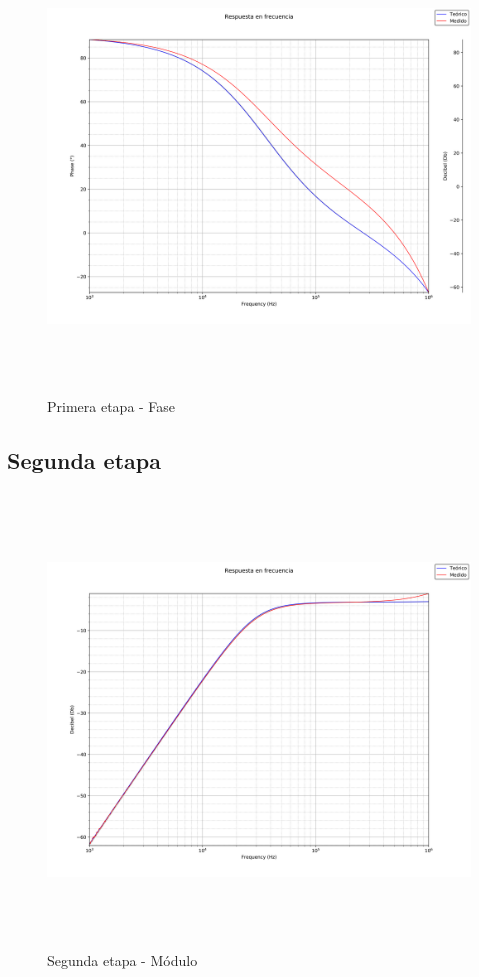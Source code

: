  \begin{figure}[H] %
	\centering
	\includegraphics[width=12cm,height=12cm,keepaspectratio]{../Imagenes/FIRST_PHA.png}
	\caption{Primera etapa - Fase}
	\label{firstP}
\end{figure}


\subsection{Segunda etapa}

 \begin{figure}[H] %
	\centering
	\includegraphics[width=12cm,height=12cm,keepaspectratio]{../Imagenes/SECOND_MOD.png}
	\caption{Segunda etapa - M\'odulo}
	\label{secondmod}
\end{figure}

